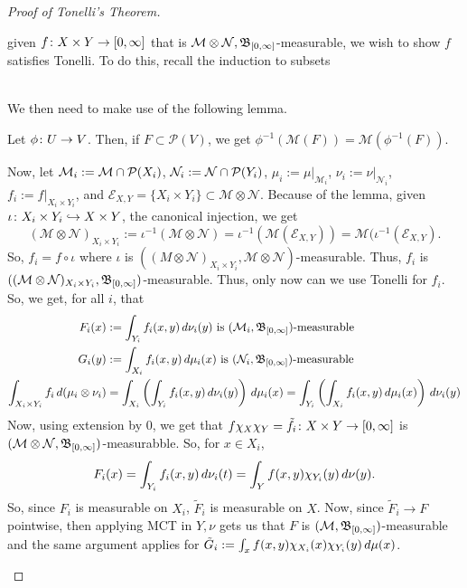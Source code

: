 \documentclass[11pt,leqno,oneside]{amsbook}
\numberwithin{thm}{section}
\renewcommand{\P}{\mathcal{P}} %
\newcommand{\M}{\mathcal{M}} %
\newcommand{\Ep}{\mathcal{E}} %
\newcommand{\cN}{\mathcal{N}}
\newcommand{\ox}{\otimes}
\begin{document}
\begin{proof}[Proof of Tonelli's Theorem]
\begin{itemize}
    given \(f \colon X \times Y \to [0,\infty]\) that is \(\M \ox \cN,
    \B_{[0,\infty]}\)-measurable, we wish to show \(f\) satisfies
    Tonelli. To do this, recall the induction to subsets \\
     \\
    We then need to make use of the following lemma.
    \begin{lem}
      Let \(\phi \colon U \to V\). Then, if \(F \subset \P(V)\), we get
      \(\phi^{-1}(\M(F)) = \M(\phi^{-1}(F))\).
    \end{lem}
    Now, let \(\M_i := \M \intersect \P(X_i)\), \(\cN_i := \cN
    \intersect \P(Y_i)\), \(\mu_i := \mu|_{\M_i}\), \(\nu_i :=
    \nu|_{\cN_i}\), \(f_i := f|_{X_i \times Y_i}\), and \(\Ep_{X,Y} =
    \{X_i \times Y_i\} \subset \M \ox \cN\).
    Because of the lemma, given \(\iota \colon X_i \times Y_i \hookrightarrow X
    \times Y\), the canonical injection, we get \[
      (\M \ox \cN)_{X_i \times Y_i} := \iota^{-1}(\M \ox \cN) =
      \iota^{-1}(\M(\Ep_{X,Y})) = \M(\iota^{-1}(\Ep_{X,Y}).
    \]
    So, \(f_i = f \circ \iota\) where \(\iota\) is \(((M \ox \cN)_{X_i
    \times Y_i},\M\ox\cN)\)-measurable. Thus, \(f_i\) is \(((\M \ox
    \cN)_{X_i \times Y_i},\B_{[0,\infty]})\)-measurable. Thus, only now
    can we use Tonelli for \(f_i\). \\

    So, we get, for all \(i\), that
    \begin{align*}
      F_i(x) &:= \int_{Y_i} f_i(x,y) \d\nu_i(y) \text{ is
      }(\M_i,\B_{[0,\infty]})\text{-measurable} \\
      G_i(y) &:= \int_{X_i} f_i(x,y) \d\mu_i(x) \text{ is }
      (\cN_i,\B_{[0,\infty]})\text{-measurable} \\
      \int_{X_i \times Y_i} f_i \d(\mu_i \ox \nu_i) & = \int_{X_i}
      \left( \int_{Y_i} f_i(x,y) \d\nu_i(y)\right) \d\mu_i(x) =
      \int_{Y_i} \left( \int_{X_i} f_i(x,y) \d\mu_i(x)\right)\d\nu_i(y)
    \end{align*}
    Now, using extension by 0, we get that \(f \chi_X \chi_Y = \tilde{f}_i \colon X \times
    Y \to [0,\infty]\) is \((\M \ox
    \cN,\B_{[0,\infty]})\)-measurabble. So, for \(x \in X_i\), \[
      F_i(x) = \int_{Y_i} f_i(x,y) \, d\nu_i(t) = \int_Y f(x,y)
      \chi_{Y_i}(y) \, d\nu(y).
    \]
    So, since \(F_i\) is measurable on \(X_i\), \(\tilde{F}_i\) is
    measurable on \(X\). Now, since \(\tilde{F}_i \to F\) pointwise,
    then applying MCT in \(Y,\nu\) gets us that \(F\) is
    \((\M,\B_{[0,\infty]})\)-measurable and the same argument applies
    for \(\tilde{G}_i := \int_x f(x,y)\chi_{X_i}(x) \chi_{Y_i}(y)
    \, d\mu(x)\). \\


\end{itemize}
\end{proof}
\end{document}
